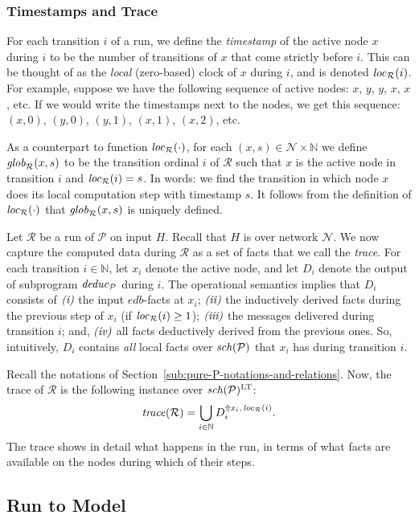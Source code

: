 \documentclass{tlp}
\newcommand{\Nat}{\mathbb{N}}  \newcommand{\len}[1]{|#1|} \newcommand{\rom}[1]{\text{\emph{(#1)}}} \newcommand{\romI}{\rom i}
\newcommand{\romII}{\rom{ii}}
\newcommand{\romIII}{\rom{iii}}
\newcommand{\romIV}{\rom{iv}}
\newcommand{\ded}{\mathcal{P}}
\newcommand{\schof}[1]{\fname{sch}(#1)}
\newcommand{\nw}{\mathcal{N}}
\newcommand{\toloct}[1]{#1^{\mathrm{LT}}}
\newcommand{\addlt}[3]{#1^{\Uparrow#2,#3}}
\newcommand{\run}{\mathcal{R}}
\newcommand{\trace}[1]{\fname{trace}(#1)}
\newcommand{\deduc}[1]{\fname{deduc}_{#1}}
\newcommand{\locR}[1]{\fname{loc}_{\run}(#1)}
\newcommand{\globR}[1]{\fname{glob}_{\run}(#1)}
\newcommand{\nwnat}{\nw\times\Nat}
\begin{document}
\subsubsection{Timestamps and Trace}

\label{sub:run-timestamps-and-trace}

For each transition $i$ of a run, we define the \emph{timestamp}
of the active node $x$ during $i$ to be the number of transitions
of $x$ that come strictly before $i$. This can be thought of as
the \emph{local} (zero-based) clock of $x$ during $i$, and is
denoted $\locR i$. For example, suppose we have the following sequence
of active nodes: $x$, $y$, $y$, $x$, $x$, etc. If we would write
the timestamps next to the nodes, we get this sequence: $(x,0)$,
$(y,0)$, $(y,1)$, $(x,1)$, $(x,2)$, etc.

As a counterpart to function $\locR{\cdot}$, for each $(x,s)\in\nwnat$
we define $\globR{x,s}$ to be the transition ordinal $i$ of $\run$
such that $x$ is the active node in transition $i$ and $\locR i=s$.
In words: we find the transition in which node $x$ does its local
computation step with timestamp $s$. It follows from the definition
of $\locR{\cdot}$ that $\globR{x,s}$ is uniquely defined.

Let $\run$ be a run of $\ded$ on input $H$. Recall that $H$ is
over network $\nw$. We now capture the computed data during $\run$
as a set of facts that we call the \emph{trace}. For each transition
$i\in\Nat$, let $x_{i}$ denote the active node, and let $D_{i}$
denote the output of subprogram $\deduc{\ded}$ during $i$. The operational
semantics implies that $D_{i}$ consists of $\romI$ the input $\mathit{edb}$-facts
at $x_{i}$; $\romII$ the inductively derived facts during the previous
step of $x_{i}$ (if $\locR i\geq1$); $\romIII$ the messages delivered
during transition $i$; and, $\romIV$ all facts deductively derived
from the previous ones. So, intuitively, $D_{i}$ contains \emph{all}
local facts over $\schof{\ded}$ that $x_{i}$ has during transition
$i$. 

Recall the notations of Section~\ref{sub:pure-P-notations-and-relations}.
Now, the trace of $\run$ is the following instance over $\toloct{\schof{\ded}}$:
\[
\trace{\run}=\bigcup_{i\in\Nat}\addlt{D_{i}}{x_{i}}{\,\locR i}.
\]
The trace shows in detail what happens in the run, in terms of what
facts are available on the nodes during which of their steps.


\subsection{Run to Model}
\end{document}
